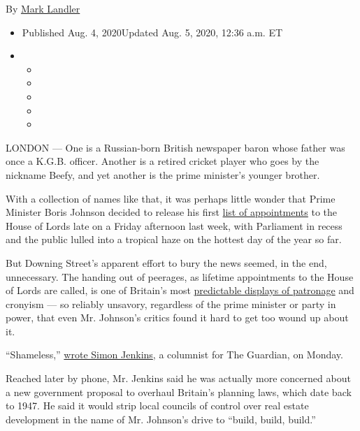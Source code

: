 By \href{https://www.nytimes.com/by/mark-landler}{Mark Landler}

\begin{itemize}
\item
  Published Aug. 4, 2020Updated Aug. 5, 2020, 12:36 a.m. ET
\item
  \begin{itemize}
  \item
  \item
  \item
  \item
  \item
  \end{itemize}
\end{itemize}

LONDON --- One is a Russian-born British newspaper baron whose father
was once a K.G.B. officer. Another is a retired cricket player who goes
by the nickname Beefy, and yet another is the prime minister's younger
brother.

With a collection of names like that, it was perhaps little wonder that
Prime Minister Boris Johnson decided to release his first
\href{https://www.nytimes.com/aponline/2020/07/31/world/europe/ap-eu-britain-house-of-lords-1st-ld-writethru.html}{list
of appointments} to the House of Lords late on a Friday afternoon last
week, with Parliament in recess and the public lulled into a tropical
haze on the hottest day of the year so far.

But Downing Street's apparent effort to bury the news seemed, in the
end, unnecessary. The handing out of peerages, as lifetime appointments
to the House of Lords are called, is one of Britain's most
\href{https://www.nytimes.com/2015/12/18/world/europe/britain-house-of-lords-changes.html}{predictable
displays of patronage} and cronyism --- so reliably unsavory, regardless
of the prime minister or party in power, that even Mr. Johnson's critics
found it hard to get too wound up about it.

``Shameless,''
\href{https://www.theguardian.com/commentisfree/2020/aug/03/boris-johnsons-list-of-lords-is-a-disgrace-corruption-westminster}{wrote
Simon Jenkins}, a columnist for The Guardian, on Monday.

Reached later by phone, Mr. Jenkins said he was actually more concerned
about a new government proposal to overhaul Britain's planning laws,
which date back to 1947. He said it would strip local councils of
control over real estate development in the name of Mr. Johnson's drive
to ``build, build, build.''

